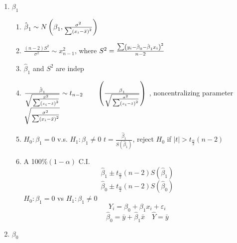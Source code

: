 \documentclass{article}
\begin{document}
\begin{enumerate}
\item $\beta _{1}$

\begin{enumerate}
\item $\hat{\beta}_{1}\sim N\left( \beta _{1},\frac{\sigma ^{2}}{\tsum
\left( x_{i}-\bar{x}\right) ^{2}}\right) $

\item $\frac{\left( n-2\right) S^{2}}{\sigma ^{2}}\sim x_{n-1}^{2}$, where $%
S^{2}=\frac{\tsum \left( y_{i}-\hat{\beta}_{0}-\hat{\beta}_{1}x_{i}\right)
^{2}}{n-2}$

\item $\hat{\beta}_{1}$ and $S^{2}$ are indep

\item $\frac{\hat{\beta}_{1}}{\sqrt{\frac{S^{2}}{\tsum \left( x_{i}-\bar{x}%
\right) ^{2}}}}\sim t_{n-2}\qquad \left( \frac{\beta _{1}}{\sqrt{\frac{%
\sigma ^{2}}{\tsum \left( x_{i}-\bar{x}\right) ^{2}}}}\right) $ ,
noncentralizing parameter $\sqrt{\frac{\sigma ^{2}}{\tsum \left( x_{i}-\bar{x%
}\right) ^{2}}}$

\item $H_{0}:\beta _{1}=0$ v.s. $H_{1}:\beta _{1}\neq 0$\newline
$t=\frac{\hat{\beta}_{1}}{S\left( \hat{\beta}_{1}\right) }$, reject $H_{0}$
if $\left\vert t\right\vert >t_{\frac{\alpha }{2}}\left( n-2\right) $

\item A 100\%$\left( 1-\alpha \right) $ C.I.%
\begin{equation*}
\hat{\beta}_{1}\pm t_{\frac{\alpha }{2}}\left( n-2\right) S\left( \hat{\beta}%
_{1}\right)
\end{equation*}%
\begin{equation*}
\hat{\beta}_{0}\pm t_{\frac{\alpha }{2}}\left( n-2\right) S\left( \hat{\beta}%
_{0}\right)
\end{equation*}%
\newline
$H_{0}:\beta _{1}=0$ vs $H_{1}:\beta _{1}\neq 0$%
\begin{equation*}
Y_{i}=\beta _{0}+\beta _{1}x_{i}+\varepsilon _{i}
\end{equation*}%
\begin{equation*}
\hat{\beta}_{0}=\bar{y}+\hat{\beta}_{1}\bar{x}\quad \hat{Y}=\bar{y}
\end{equation*}
\end{enumerate}

\item $\beta _{0}$


\end{enumerate}
\end{document}
